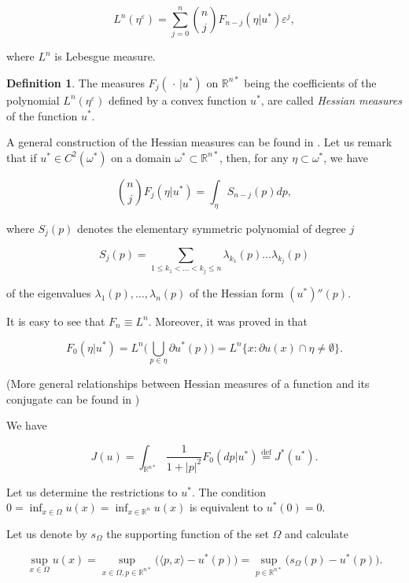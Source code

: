 \documentclass[14pt]{extarticle}
\renewcommand{\le}{\leqslant}
\newcommand{\R}{\mathbb{R}}
\newcommand{\eqdef}{\stackrel{\mathrm{def}}{=}}
\theoremstyle{remark}
\theoremstyle{definition}
\newtheorem{defn}{Definition}
\begin{document}
\[
	L^n(\eta^\varepsilon) = \sum_{j=0}^n \binom{n}{j} F_{n-j}(\eta|u^*) \varepsilon^{j},
\]

\noindent where $L^n$  is Lebesgue measure.

\begin{defn}
	The measures $F_j(\,\cdot\,|u^*)$ on $\R^{n*}$ being the coefficients of the polynomial $L^n(\eta^\varepsilon)$ defined by a convex function $u^*$, are called \textit{Hessian measures} of the function $u^*$.
\end{defn}

A general construction of the Hessian measures can be found in \cite{ColesantiHug}. Let us remark that if
$u^*\in C^2(\omega^*)$ on a domain $\omega^*\subset \R^{n*}$, then, for any $\eta\subset\omega^*$, we have

\begin{equation}
\label{eq:F_j_S_j}
	\binom{n}{j} F_{j}(\eta|u^*) = \int_\eta S_{n-j}(p) dp,
\end{equation}

\noindent where $S_j(p)$ denotes the elementary symmetric polynomial of degree $j$

\[
	S_j(p) = \sum_{1\le k_1 < \ldots<k_j\le n} \lambda_{k_1}(p)\ldots\lambda_{k_j}(p)
\]

\noindent of the eigenvalues $\lambda_1(p),\ldots,\lambda_n(p)$ of the Hessian form $(u^*)''(p)$.

It is easy to see that $F_n\equiv L^n$. Moreover, it was proved in \cite{ColesantiFirst} that
 
\begin{equation}
\label{eq:F_0_and_L_n}
	F_0(\eta|u^*) = L^n\Big( \bigcup_{p\in\eta}\partial u^*(p) \Big) = 
	L^n\Big\{ x: \partial u(x)\cap\eta\ne\emptyset \Big\}.
\end{equation}

\noindent (More general relationships between Hessian measures of a function and its conjugate can be found in  \cite[Theorem 5.8]{ColesantiHug})

We have

\[
	J(u) = \int_{\R^{n*}} \frac{1}{1+|p|^2} F_0(dp|u^*) \eqdef J^*(u^*).
\]

Let us determine the restrictions to $u^*$. The condition $0=\inf_{x\in\Omega}u(x) = \inf_{x\in\R^n}u(x)$ is equivalent to $u^*(0)=0$.

Let us denote by $s_\Omega$ the supporting function of the set $\Omega$ and calculate

\[
	\sup_{x\in\Omega}u(x) = \sup_{x\in\Omega,p\in\R^{n*}}\big(\langle p,x\rangle - u^*(p) \big) = 
	\sup_{p\in\R^{n*}}\big( s_\Omega(p) - u^*(p)\big).
\]
\end{document}

